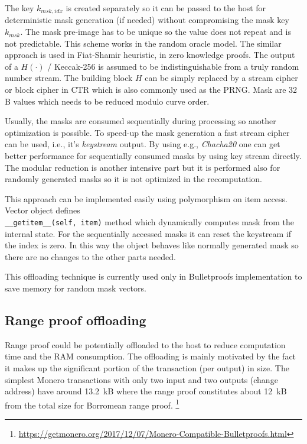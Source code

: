 \documentclass[]{article}
\begin{document}
The key $k_{msk,idx}$ is created separately so it can be passed to the host for deterministic mask generation (if needed) without compromising the mask key $k_{msk}$.
The mask pre-image has to be unique so the value does not repeat and is not predictable. This scheme works in the random oracle model. The similar approach is used in Fiat-Shamir heuristic, in zero knowledge proofs. The output of a $H(\cdot)$ / Keccak-256 is assumed to be indistinguishable from a truly random number stream. The building block $H$ can be simply replaced by a stream cipher or block cipher in CTR which is also commonly used as the PRNG. Mask are 32 B values which needs to be reduced modulo curve order.

Usually, the masks are consumed sequentially during processing so another optimization is possible. To speed-up the mask generation a fast stream cipher can be used, i.e., it's \emph{keystream} output. By using e.g., \emph{Chacha20} one can get better performance for sequentially consumed masks by using key stream directly. The modular reduction is another intensive part but it is performed also for randomly generated masks so it is not optimized in the recomputation.

This approach can be implemented easily using polymorphism on item access. Vector object defines \\ \verb|__getitem__(self, item)| method which dynamically computes mask from the internal state. For the sequentially accessed masks it can reset the keystream if the index is zero. In this way the object behaves like normally generated mask so there are no changes to the other parts needed. 

This offloading technique is currently used only in Bulletproofs implementation to save memory for random mask vectors.

\subsection{Range proof offloading}
Range proof could be potentially offloaded to the host to reduce computation time and the RAM consumption.
The offloading is mainly motivated by the fact it makes up the significant portion of the transaction (per output) in size. The simplest Monero transactions with only two input and two outputs (change address) have around 
13.2~kB where the range proof constitutes about 12~kB from the total size for Borromean range proof. \footnote{\url{https://getmonero.org/2017/12/07/Monero-Compatible-Bulletproofs.html}}
\end{document}
